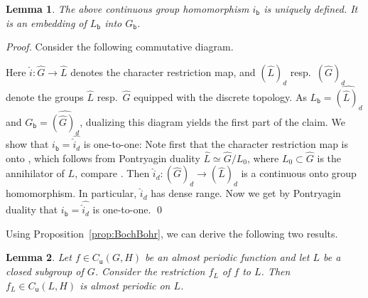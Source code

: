 \documentclass[11pt, a4wide]{amsart}
\newtheorem{lemma}{Lemma}
\numberwithin{lemma}{section}
\begin{document}
\begin{appendix}
\begin{center}
\end{center}



\begin{lemma}\label{rem:com}
The above continuous group homomorphism $i_\mathsf{b}$ is uniquely defined.
It is an embedding of $L_\mathsf{b}$ into $G_\mathsf{b}$.
\end{lemma}

\begin{proof}
Consider the following commutative diagram.
%
\begin{center}
\end{center}
%
Here  $\widehat{i}:\widehat G\to\widehat L$ denotes the character restriction map, and $({\widehat L})_d$ resp.~$({\widehat G})_d$ denote the groups $\widehat L$ resp.~$\widehat G$ equipped with the discrete topology.
As $L_\mathsf{b}=\widehat{(\widehat L)_d}$ and   $G_\mathsf{b}=\widehat{(\widehat G)_d}$, dualizing this diagram yields the first part of the claim.
We show that $i_\mathsf{b}=\widehat{\widehat{i}_d}$ is one-to-one: Note first that the character restriction map is onto \cite[Thm.~4.2.14]{Rei2}, which follows from Pontryagin duality $\widehat L \simeq \widehat G/ L_0$, where $L_0\subset \widehat G$ is the annihilator of $L$, compare \cite[Thm.~4.2.21]{Rei2}.
Then $\widehat{i}_d:(\widehat G)_d\to(\widehat L)_d$ is a continuous onto group homomorphism. In particular, $\widehat{i}_d$ has dense range. Now we get by Pontryagin duality that $i_\mathsf{b}=\widehat{\widehat{i}_d}$ is one-to-one.
\qed
\end{proof}

Using Proposition~\ref{prop:BochBohr}, we can derive the following two results.

\begin{lemma} \label{almost-periodic-on-G-is-on-L}
Let $f\in C_\mathsf{u}(G,H)$ be an almost periodic function and let $L$ be a closed subgroup of  $G$. Consider the restriction $f_L$ of $f$ to $L$. Then $f_L\in C_\mathsf{u}(L,H)$ is almost periodic on $L$.
\end{lemma}


\end{appendix}
\end{document}

